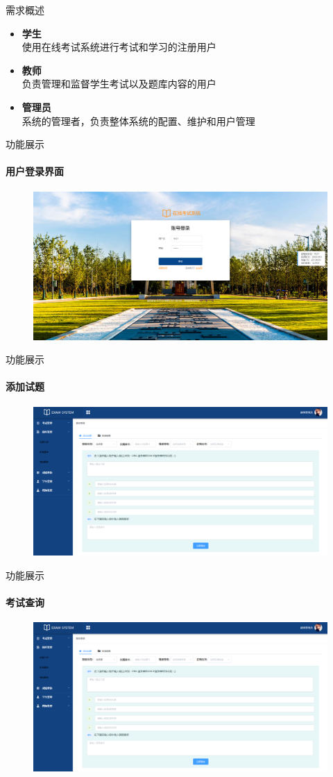 \documentclass{beamer}
\begin{document}
\begin{frame}[fragile]{需求概述}
\begin{itemize}
    \item \textbf{学生}\\
    \qquad 使用在线考试系统进行考试和学习的注册用户
    \item \textbf{教师}\\
    \qquad 负责管理和监督学生考试以及题库内容的用户
    \item \textbf{管理员}\\
    \qquad 系统的管理者，负责整体系统的配置、维护和用户管理
\end{itemize}
\end{frame}


\begin{frame}[fragile]{功能展示}
\framesubtitle{用户登录界面}
\begin{figure}
    \centering
    \includegraphics[width=0.75\linewidth]{1.png}
\end{figure}
\end{frame}

\begin{frame}[fragile]{功能展示}
\framesubtitle{添加试题}
\begin{figure}
    \centering
    \includegraphics[width=0.75\linewidth]{2.png}
\end{figure}
\end{frame}

\begin{frame}[fragile]{功能展示}
\framesubtitle{考试查询}
\begin{figure}
    \centering
    \includegraphics[width=0.75\linewidth]{2.png}
\end{figure}
\end{frame}
\end{document}

